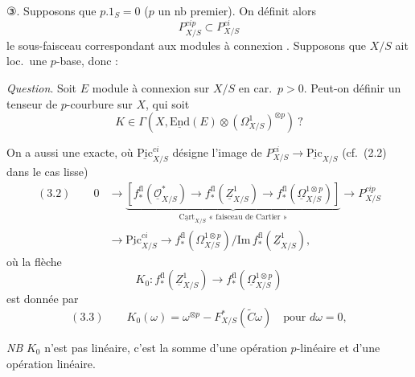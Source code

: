 \documentclass[11pt,a4paper]{article}
\begin{document}
③. Supposons que $p.1_{S} = 0$ ($p$ un nb premier). On définit alors
\[
P^{cip}_{X/S} \subset P^{ci}_{X/S}
\]
le sous-faisceau correspondant aux modules à connexion   \add{\ill{}}. Supposons que $X/S$ ait loc.\ une $p$-base, donc \ill{} :



\emph{Question}. Soit $E$ module à connexion   sur $X/S$ en car.\ $p > 0$. Peut-on définir un tenseur \struck{\ill{}} de $p$-courbure sur $X$, qui soit
\[
K \in \Gamma(X, \underline{\mathrm{End}}(E) \otimes (\Omega^{1}_{X/S})^{\otimes p}) \ ?
\]

On a aussi une   exacte, où $\underline{\mathrm{Pic}}^{ci}_{X/S}$ désigne l'image de $P^{ci}_{X/S} \to \underline{\mathrm{Pic}}_{X/S}$ (cf.\ (2.2) dans le cas lisse)
\[
\begin{aligned}
(3.2) \qquad 0 &\to \underbrace{[f^{\mathrm{fl}}_{*}(\underline{\mathcal{O}}^{*}_{X/S}) \to f^{\mathrm{fl}}_{*}(\underline{Z}^{1}_{X/S}) \to f^{\mathrm{fl}}_{*}(\underline{\Omega}^{1\otimes p}_{X/S})]}_{\underline{\mathrm{Cart}}_{X/S} \text{ « faisceau de Cartier »}} \to P^{cip}_{X/S} \\
&\to \underline{\mathrm{Pic}}^{ci}_{X/S} \to f^{\mathrm{fl}}_{*}(\Omega^{1\otimes p}_{X/S})/\mathrm{Im}\, f^{\mathrm{fl}}_{*}(\underline{Z}^{1}_{X/S}),
\end{aligned}
\]
où la flèche
\[
K_{0} : f^{\mathrm{fl}}_{*}(\underline{Z}^{1}_{X/S}) \to f^{\mathrm{fl}}_{*}(\underline{\Omega}^{1\otimes p}_{X/S})
\]
est donnée par
\[
(3.3) \qquad K_{0}(\omega) = \omega^{\otimes p} - F^{*}_{X/S}(\tilde{C}\omega) \quad \text{pour } d\omega = 0,
\]

\emph{NB} $K_{0}$  n'est pas linéaire, c'est la somme d'une opération $p$-linéaire et d'une opération linéaire.
\end{document}
